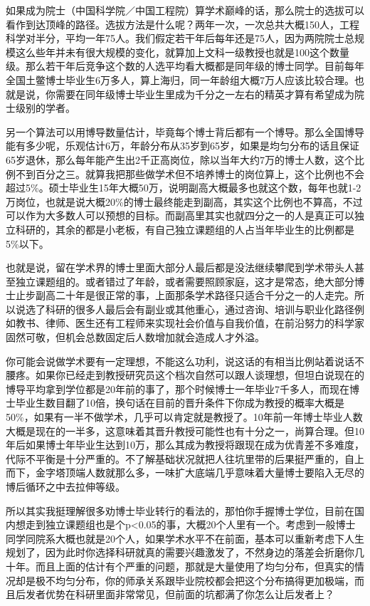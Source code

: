 \documentclass[]{tufte-book}
\begin{document}
如果成为院士（中国科学院／中国工程院）算学术巅峰的话，那么院士的选拔可以看作到达顶峰的路径。选拔方法是什么呢？两年一次，一次总共大概150人，工程科学对半分，平均一年75人。我们假定若干年后每年还是75人，因为两院院士总规模这么些年并未有很大规模的变化，就算加上文科一级教授也就是100这个数量级。那么若干年后竞争这个数的人选平均看大概都是同年级的博士同学。目前每年全国土鳖博士毕业生6万多人，算上海归，同一年龄组大概7万人应该比较合理。也就是说，你需要在同年级博士毕业生里成为千分之一左右的精英才算有希望成为院士级别的学者。

另一个算法可以用博导数量估计，毕竟每个博士背后都有一个博导。那么全国博导能有多少呢，乐观估计6万，年龄分布从35岁到65岁，如果是均匀分布的话且保证65岁退休，那么每年能产生出2千正高岗位，除以当年大约7万的博士人数，这个比例不到百分之三。就算我把那些做学术但不培养博士的岗位算上，这个比例也不会超过5\%。硕士毕业生15年大概50万，说明副高大概最多也就这个数，每年也就1-2万岗位，也就是说大概20\%的博士最终能走到副高，其实这个比例也不算高，不过可以作为大多数人可以预想的目标。而副高里其实也就四分之一的人是真正可以独立科研的，其余的都是小老板，有自己独立课题组的人占当年毕业生的比例都是5\%以下。

也就是说，留在学术界的博士里面大部分人最后都是没法继续攀爬到学术带头人甚至独立课题组的。或者错过了年龄，或者需要照顾家庭，这才是常态，绝大部分博士止步副高二十年是很正常的事，上面那条学术路径只适合千分之一的人走完。所以说选了科研的很多人最后会有副业或其他重心，通过咨询、培训与职业化路径例如教书、律师、医生还有工程师来实现社会价值与自我价值，在前沿努力的科学家固然可敬，但机会总数固定后人数增加就会造成人才外溢。

你可能会说做学术要有一定理想，不能这么功利，说这话的有相当比例站着说话不腰疼。如果你已经走到教授研究员这个档次自然可以跟人谈理想，但坦白说现在的博导平均拿到学位都是20年前的事了，那个时候博士一年毕业7千多人，而现在博士毕业生数目翻了10倍，换句话在目前的晋升条件下你成为教授的概率大概是50\%，如果有一半不做学术，几乎可以肯定就是教授了。10年前一年博士毕业人数大概是现在的一半多，这意味着其晋升教授可能性也有十分之一，尚算合理。但10年后如果博士年毕业生达到10万，那么其成为教授将跟现在成为优青差不多难度，代际不平衡是十分严重的。不了解基础状况就把人往坑里带的后果挺严重的，自上而下，金字塔顶端人数就那么多，一味扩大底端几乎意味着大量博士要陷入无尽的博后循环之中去拉伸等级。

所以其实我挺理解很多劝博士毕业转行的看法的，那怕你手握博士学位，目前在国内想走到独立课题组也是个p\textless0.05的事，大概20个人里有一个。考虑到一般博士同学同院系大概也就是20个人，如果学术水平不在前面，基本可以重新考虑下人生规划了，因为此时你选择科研就真的需要兴趣激发了，不然身边的落差会折磨你几十年。而且上面的估计有个严重的问题，那就是大量使用了均匀分布，但真实的情况却是极不均匀分布，你的师承关系跟毕业院校都会把这个分布搞得更加极端，而且后发者优势在科研里面非常常见，但前面的坑都满了你怎么让后发者上？
\end{document}

